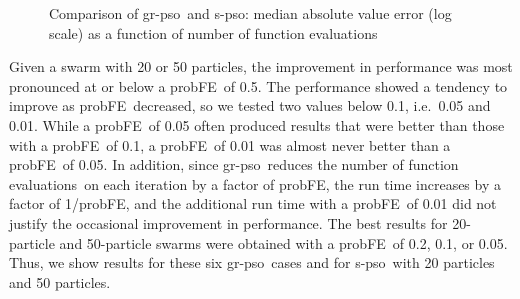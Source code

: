 \documentclass[a4paper,twoside]{article}
\newcommand{\fes}{function evaluations}
\newcommand{\pfe}{{probFE}}
\newcommand{\spso}{{\sc s-pso}}
\newcommand{\cfe}{{\sc gr-pso}}
\begin{document}
\begin{figure}
{}
\caption{Comparison of \cfe\ and \spso: median absolute value error (log scale) as a function of number of \fes}
\label{f:gbest-graphs}
\end{figure}


Given a swarm with 20 or 50 particles, the improvement in performance was most pronounced at or below a \pfe\ of 0.5.  The performance showed a tendency to improve as \pfe\ decreased, so we tested  two values below 0.1, i.e.\ 0.05 and 0.01.  While a \pfe\ of 0.05 often produced results that were better than those with a \pfe\ of 0.1, a \pfe\ of 0.01 was almost never better than a \pfe\ of 0.05.  In addition, since \cfe\ reduces the number of \fes\ on each iteration by a factor of \pfe, the run time increases by a factor of 1/\pfe, and the additional run time with a \pfe\ of 0.01 did not justify the occasional improvement in performance.  The best results for 20-particle and 50-particle swarms were obtained with a \pfe\ of 0.2, 0.1, or 0.05. Thus, we show results for these six \cfe\ cases and for \spso\ with 20 particles and 50 particles.
\end{document}
